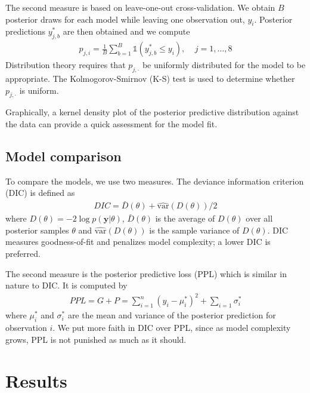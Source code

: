\documentclass{asaproc}
\newcommand{\m}[1]{\mathbf{\bm{#1}}}
\begin{document}
The second measure is based on leave-one-out cross-validation. We obtain $B$ posterior draws for each model while leaving one observation out, $y_i$. Posterior predictions $y_{j,b}^*$ are then obtained and we compute
\begin{eqnarray*}
p_{j,i}=\frac{1}{B}\sum_{b=1}^B \mathds{1}(y_{j,b}^* \leq y_i),~~~~~j=1,\ldots,8
\end{eqnarray*}
Distribution theory requires that $p_{j,\cdot}$ be uniformly distributed for the model to be appropriate. The Kolmogorov-Smirnov (K-S) test is used to determine whether $p_{j,\cdot}$ is uniform.

Graphically, a kernel density plot of the posterior predictive distribution against the data can provide a quick assessment for the model fit.

\subsection{Model comparison}

To compare the models, we use two measures. The deviance information criterion (DIC) is defined as
\begin{eqnarray*}
DIC=\bar{D}(\theta)+\widehat{\mathrm{var}}(D(\theta))/2
\end{eqnarray*}
where $D(\theta)=-2\log p(\m{y}|\theta)$, $\bar{D}(\theta)$ is the average of $D(\theta)$ over all posterior samples $\theta$ and $\widehat{\mathrm{var}}(D(\theta))$ is the sample variance of $D(\theta)$. DIC measures goodness-of-fit and penalizes model complexity; a lower DIC is preferred.

The second measure is the posterior predictive loss (PPL) which is similar in nature to DIC. It is computed by
\begin{eqnarray*}
PPL=G+P=\sum_{i=1}^n(y_i-\mu_i^*)^2 + \sum_{i=1}\sigma_i^*
\end{eqnarray*}
where $\mu_i^*$ and $\sigma_i^*$ are the mean and variance of the posterior prediction for observation $i$. We put more faith in DIC over PPL, since as model complexity grows, PPL is not punished as much as it should.

\section{Results}
\end{document}

